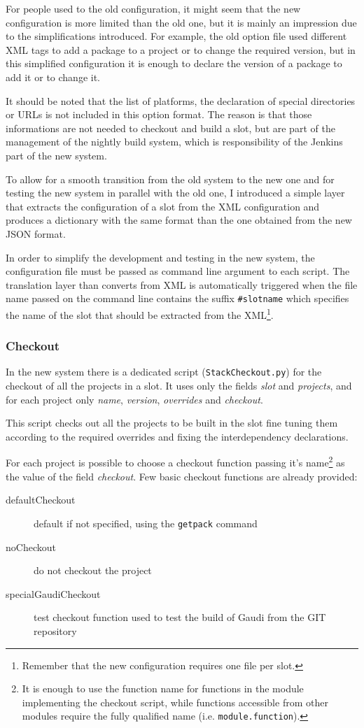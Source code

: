 \documentclass{lhcbnote}
\begin{document}
For people used to the old configuration, it might seem that the new
configuration is more limited than the old one, but it is mainly an impression
due to the simplifications introduced.  For example, the old option file used
different XML tags to add a package to a project or to change the required
version, but in this simplified configuration it is enough to declare the
version of a package to add it or to change it.

It should be noted that the list of platforms, the declaration of special
directories or URLs is not included in this option format.  The reason is that
those informations are not needed to checkout and build a slot, but are part of
the management of the nightly build system, which is responsibility of the
Jenkins part of the new system.

To allow for a smooth transition from the old system to the new one and for
testing the new system in parallel with the old one, I introduced a simple layer
that extracts the configuration of a slot from the XML configuration and
produces a dictionary with the same format than the one obtained from the new
JSON format.

In order to simplify the development and testing in the new system, the
configuration file must be passed as command line argument to each script.  The
translation layer than converts from XML is automatically triggered when the
file name passed on the command line contains the suffix \texttt{\#slotname}
which specifies the name of the slot that should be extracted from the
XML\footnote{%
  Remember that the new configuration requires one file per slot.}.

\subsubsection{Checkout}
In the new system there is a dedicated script (\texttt{StackCheckout.py}) for
the checkout of all the projects in a slot.  It uses only the fields \emph{slot}
and \emph{projects}, and for each project only \emph{name}, \emph{version},
\emph{overrides} and \emph{checkout}.

This script checks out all the projects to be built in the slot fine tuning them
according to the required overrides and fixing the interdependency declarations.

For each project is possible to choose a checkout function passing it's
name\footnote{It is enough to use the function name for functions in the module
implementing the checkout script, while functions accessible from other modules
require the fully qualified name (i.e. \texttt{module.function}).} as the value
of the field \emph{checkout}.  Few basic checkout functions are already
provided:
\begin{description}
  \item[defaultCheckout] default if not specified, using the \texttt{getpack}
  command
  \item[noCheckout] do not checkout the project
  \item[specialGaudiCheckout] test checkout function used to test the build of
  Gaudi from the GIT repository
\end{description}
\end{document}
